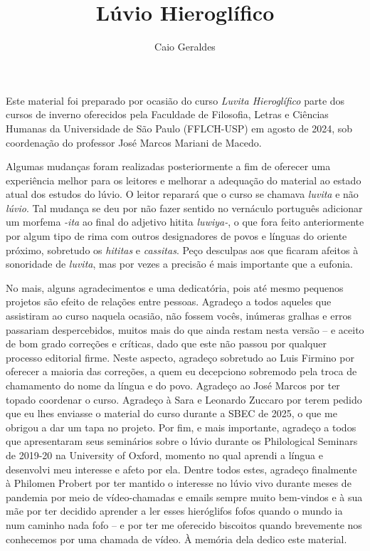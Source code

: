 \documentclass{luviolivro}
\title{Lúvio Hieroglífico}
\author{Caio Geraldes}
\begin{document}
\frontmatter

\thetitlepage%


\cleardoublepage%


\cleardoublepage%
\tableofcontents*

\cleardoublepage%
\listoffigures*



Este material foi preparado por ocasião do curso \emph{Luvita Hieroglífico}
parte dos cursos de inverno oferecidos pela Faculdade de Filosofia, Letras e
Ciências Humanas da Universidade de São Paulo (FFLCH-USP) em agosto de 2024, sob
coordenação do professor José Marcos Mariani de Macedo.

Algumas mudanças foram realizadas posteriormente a fim de oferecer uma
experiência melhor para os leitores e melhorar a adequação do material ao estado
atual dos estudos do lúvio.
O leitor reparará que o curso se chamava \emph{luvita} e não \emph{lúvio}.
Tal mudança se deu por não fazer sentido no vernáculo português adicionar um
morfema \emph{-ita} ao final do adjetivo hitita \emph{luwiya-}, o que fora feito
anteriormente por algum tipo de rima com outros designadores de povos e línguas
do oriente próximo, sobretudo os \emph{hititas} e \emph{cassitas}.
Peço desculpas aos que ficaram afeitos à sonoridade de \emph{luvita}, mas por
vezes a precisão é mais importante que a eufonia.

No mais, alguns agradecimentos e uma dedicatória, pois até mesmo pequenos
projetos são efeito de relações entre pessoas.
Agradeço a todos aqueles que assistiram ao curso naquela ocasião, não
fossem vocês, inúmeras gralhas e erros passariam despercebidos, muitos mais do
que ainda restam nesta versão -- e aceito de bom grado correções e críticas,
dado que este não passou por qualquer processo editorial firme.
Neste aspecto, agradeço sobretudo ao Luis Firmino por oferecer a maioria das
correções, a quem eu decepciono sobremodo pela troca de chamamento do nome da
língua e do povo.
Agradeço ao José Marcos por ter topado coordenar o curso.
Agradeço à Sara e Leonardo Zuccaro por terem pedido que eu lhes enviasse o
material do curso durante a SBEC de 2025, o que me obrigou a dar um tapa no
projeto.
Por fim, e mais importante, agradeço a todos que apresentaram seus seminários
sobre o lúvio durante os Philological Seminars de 2019-20 na University of
Oxford, momento no qual aprendi a língua e desenvolvi meu interesse e afeto por
ela.
Dentre todos estes, agradeço finalmente à Philomen Probert por ter mantido o
interesse no lúvio vivo durante meses de pandemia por meio de vídeo-chamadas e
emails sempre muito bem-vindos e à sua mãe por ter decidido aprender a ler esses
hieróglifos fofos quando o mundo ia num caminho nada fofo -- e por ter me oferecido
biscoitos quando brevemente nos conhecemos por uma chamada de vídeo.
À memória dela dedico este material.
\end{document}
